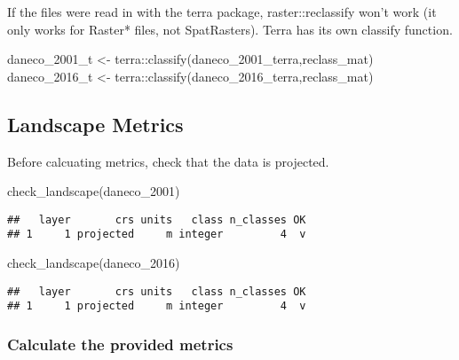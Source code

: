 \documentclass[
]{article}
\newenvironment{Shaded}{\begin{snugshade}}{\end{snugshade}}
\newcommand{\FunctionTok}[1]{\textcolor[rgb]{0.00,0.00,0.00}{#1}}
\newcommand{\NormalTok}[1]{#1}
\newcommand{\OtherTok}[1]{\textcolor[rgb]{0.56,0.35,0.01}{#1}}
\newcommand{\SpecialCharTok}[1]{\textcolor[rgb]{0.00,0.00,0.00}{#1}}
\begin{document}
If the files were read in with the terra package, raster::reclassify
won't work (it only works for Raster* files, not SpatRasters). Terra has
its own classify function.

\begin{Shaded}
\begin{Highlighting}[]
\NormalTok{daneco\_2001\_t }\OtherTok{\textless{}{-}}\NormalTok{ terra}\SpecialCharTok{::}\FunctionTok{classify}\NormalTok{(daneco\_2001\_terra,reclass\_mat)}
\NormalTok{daneco\_2016\_t }\OtherTok{\textless{}{-}}\NormalTok{ terra}\SpecialCharTok{::}\FunctionTok{classify}\NormalTok{(daneco\_2016\_terra,reclass\_mat)}
\end{Highlighting}
\end{Shaded}

\hypertarget{landscape-metrics}{%
\subsection{Landscape Metrics}\label{landscape-metrics}}

Before calcuating metrics, check that the data is projected.

\begin{Shaded}
\begin{Highlighting}[]
\FunctionTok{check\_landscape}\NormalTok{(daneco\_2001)}
\end{Highlighting}
\end{Shaded}

\begin{verbatim}
##   layer       crs units   class n_classes OK
## 1     1 projected     m integer         4  v
\end{verbatim}

\begin{Shaded}
\begin{Highlighting}[]
\FunctionTok{check\_landscape}\NormalTok{(daneco\_2016)}
\end{Highlighting}
\end{Shaded}

\begin{verbatim}
##   layer       crs units   class n_classes OK
## 1     1 projected     m integer         4  v
\end{verbatim}

\hypertarget{calculate-the-provided-metrics}{%
\subsubsection{Calculate the provided
metrics}\label{calculate-the-provided-metrics}}
\end{document}
